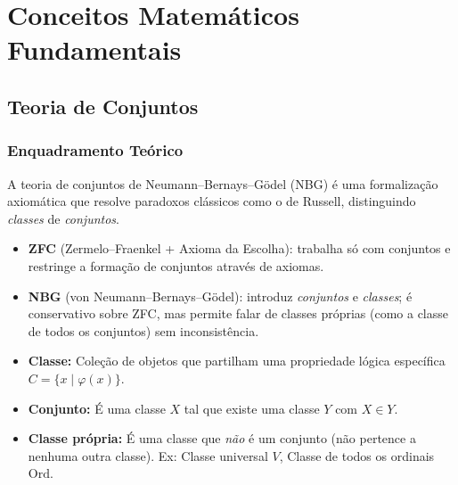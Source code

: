 
\chapter{Conceitos Matemáticos Fundamentais}

\section{Teoria de Conjuntos}

\subsection{Enquadramento Teórico}

A teoria de conjuntos de Neumann--Bernays--Gödel (NBG) é uma formalização axiomática que resolve paradoxos clássicos como o de Russell, distinguindo \emph{classes} de \emph{conjuntos}. 

\begin{notebox}[title={Contexto Histórico e Comparação NBG vs.\ ZFC}]
  \begin{itemize}
    \item \textbf{ZFC} (Zermelo--Fraenkel + Axioma da Escolha): trabalha só com conjuntos e restringe a formação de conjuntos através de axiomas.
    \item \textbf{NBG} (von Neumann--Bernays--Gödel): introduz \emph{conjuntos} e \emph{classes}; é conservativo sobre ZFC, mas permite falar de classes próprias (como a classe de todos os conjuntos) sem inconsistência.
  \end{itemize}
\end{notebox}

\begin{defbox}[title={Classes e Conjuntos}]
  \begin{itemize}
      \item \textbf{Classe:} Coleção de objetos que partilham uma propriedade lógica específica $C = \{ x \mid \varphi(x) \}$.
      \item \textbf{Conjunto:} É uma classe $X$ tal que existe uma classe $Y$ com $X \in Y$.
      \item \textbf{Classe própria:} É uma classe que \emph{não} é um conjunto (não pertence a nenhuma outra classe). Ex: Classe universal $V$, Classe de todos os ordinais $\mathrm{Ord}$.
  \end{itemize}
\end{defbox}

